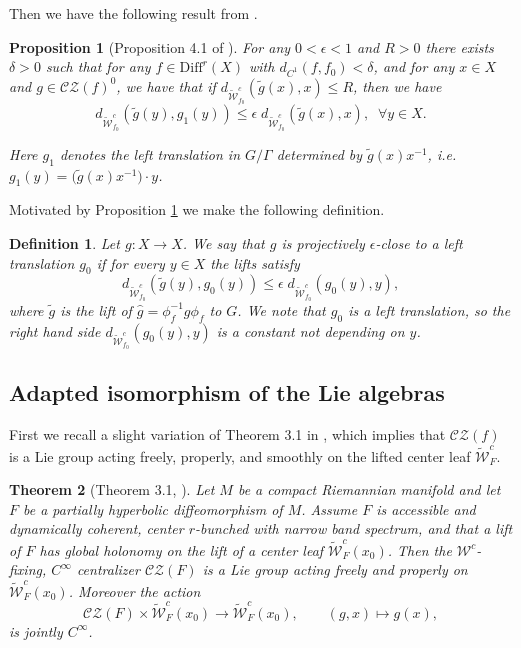 \documentclass[11pt]{amsart}
\numberwithin{equation}{section}
\newcommand{\CZ}{\mathcal{CZ}}
\theoremstyle{plain}
\newtheorem{thm}{Theorem}[section]
\newtheorem{prop}[thm]{Proposition}
\newtheorem{defi}{Definition}[section]
\begin{document}
Then we have the following result from \cite{Wang26}.

\begin{prop}[Proposition 4.1 of \cite{Wang26}]\label{gtransl}
For any $0<\epsilon<1$ and $R>0$ there exists $\delta>0$ such that for any
$f\in\mathrm{Diff}^r(X)$ with $d_{C^1}(f,f_0)<\delta$, and for any
$x\in X$ and $g\in\CZ(f)^0$, we have that if
$d_{\widetilde{\mathcal W}^c_{f_0}}(\tilde g(x),x)\le R$, then we have
\[
d_{\widetilde{\mathcal W}^c_{f_0}}(\tilde g(y),g_1(y))
\le \epsilon\; d_{\widetilde{\mathcal W}^c_{f_0}}(\tilde{g}(x),x),
\;\; \forall y\in X.
\]

Here $g_1$ denotes the left translation in $G/\Gamma$ determined by
$\tilde g(x)x^{-1}$, i.e.
$g_1(y)=\big(\tilde g(x)x^{-1}\big)\cdot y$.


\end{prop}



Motivated by Proposition \ref{gtransl} we make the following definition.

\begin{defi}\label{def:projepsclose}
Let $g:X\to X$. We say that $g$ is \emph{projectively $\epsilon$-close} to a left
translation $g_0$ if for every $y\in X$ the lifts satisfy
\[
d_{\widetilde{\mathcal W}^c_{f_0}}(\tilde g(y),g_0(y))
\le \epsilon\; d_{\widetilde{\mathcal W}^c_{f_0}}(g_0(y),y),
\]
where $\tilde g$ is the lift of  $\hat g=\phi_f^{-1} g\phi_f$ to $G$.
We note that $g_0$ is a left translation, so the right hand side
$d_{\widetilde{\mathcal W}^c_{f_0}}(g_0(y),y)$ is a constant not
depending on $y$.
\end{defi}

\subsection{Adapted isomorphism of the Lie algebras}

First we recall a slight variation of Theorem 3.1 in \cite{Wang}, which
implies that $\CZ(f)$ is a Lie group acting freely, properly, and smoothly
on the lifted center leaf $\widetilde{\mathcal W}^c_F$.

\begin{thm}[Theorem 3.1, \cite{Wang}]\label{czlieg}
Let $M$ be a compact Riemannian manifold and let $F$ be a partially
hyperbolic diffeomorphism of $M$. Assume $F$ is accessible and dynamically
coherent, center $r$-bunched with narrow band spectrum, and that a lift of
$F$ has global holonomy on the lift of a center leaf
$\widetilde{\mathcal W}^c_F(x_0)$. Then the $\mathcal W^c$-fixing,
$C^\infty$ centralizer $\CZ(F)$ is a Lie group acting freely and
properly on $\widetilde{\mathcal W}^c_F(x_0)$. Moreover the action
\[
\CZ(F)\times \widetilde{\mathcal W}^c_F(x_0)\to\widetilde{\mathcal W}^c_F(x_0),
\qquad (g,x)\mapsto g(x),
\]
is jointly $C^\infty$.
\end{thm}
\end{document}
